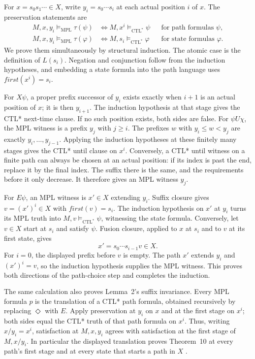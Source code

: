 For \(x=s_0s_1\cdots\in X\), write \(y_i=s_0\cdots s_i\) at each
actual position \(i\) of \(x\).  The preservation statements are
\[
\begin{aligned}
 M,x,y_i\models_{\mathrm{MPL}}\tau(\psi)
 &\Longleftrightarrow M,x^i\models_{\mathrm{CTL}^*}\psi
 &&\text{for path formulas }\psi,\\
 M,x,y_i\models_{\mathrm{MPL}}\tau(\varphi)
 &\Longleftrightarrow M,s_i\models_{\mathrm{CTL}^*}\varphi
 &&\text{for state formulas }\varphi.
\end{aligned}
\]
We prove them simultaneously by structural induction.
The atomic case is the definition of \(L(s_i)\).
Negation and conjunction follow from the induction hypotheses, and
embedding a state formula into the path language uses
\(first(x^i)=s_i\).

For \(X\psi\), a proper prefix successor of \(y_i\) exists exactly
when \(i+1\) is an actual position of \(x\); it is then \(y_{i+1}\).
The induction hypothesis at that stage gives the CTL* next-time clause.
If no such position exists, both sides are false.
For \(\psi U\chi\), the MPL witness is a prefix \(y_j\) with
\(j\geq i\).  The prefixes \(w\) with \(y_i\leq w<y_j\) are
exactly \(y_i,\ldots,y_{j-1}\).  Applying the induction hypotheses at
these finitely many stages gives the CTL* until clause on \(x^i\).
Conversely, a CTL* until witness on a finite path can always be chosen
at an actual position: if its index is past the end, replace it by
the final index.  The suffix there is the same, and the requirements
before it only decrease.  It therefore gives an MPL witness \(y_j\).

For \(E\psi\), an MPL witness is \(x'\in X\) extending \(y_i\).
Suffix closure gives \(v=(x')^i\in X\) with \(first(v)=s_i\).
The induction hypothesis on \(x'\) at \(y_i\) turns its MPL truth
into \(M,v\models_{\mathrm{CTL}^*}\psi\), witnessing the state formula.
Conversely, let \(v\in X\) start at \(s_i\) and satisfy \(\psi\).
Fusion closure, applied to \(x\) at \(s_i\) and to \(v\) at its first
state, gives
\[
 x'=s_0\cdots s_{i-1}v\in X.
\]
For \(i=0\), the displayed prefix before \(v\) is empty.
The path \(x'\) extends \(y_i\) and \((x')^i=v\), so the induction
hypothesis supplies the MPL witness.  This proves both directions of
the path-choice step and completes the induction.

The same calculation also proves Lemma~2's suffix invariance.
Every MPL formula \(p\) is the translation of a CTL* path formula,
obtained recursively by replacing \(\Diamond\) with \(E\).
Apply preservation at \(y_i\) on \(x\) and at the first stage on
\(x^i\); both sides equal the CTL* truth of that path formula on \(x^i\).
Thus, writing \(x/y_i=x^i\), satisfaction at \(M,x,y_i\) agrees
with satisfaction at the first stage of \(M,x/y_i\).
In particular the displayed translation proves Theorem~10 at every
path's first stage and at every state that starts a path in \(X\)
\cite[Lemma~2 and Theorem~10, pp.~165--166]{EmersonHalpern1986}.


